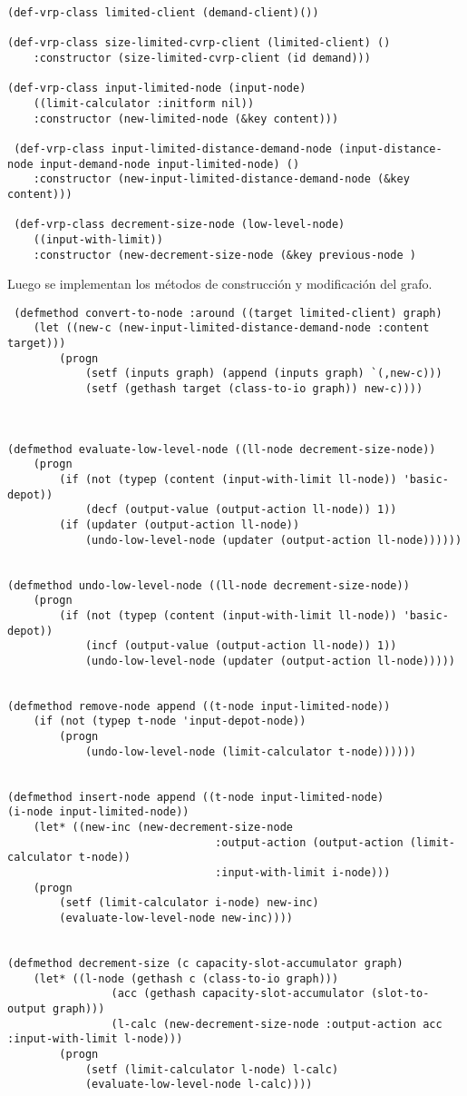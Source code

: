 \begin{lstlisting}
(def-vrp-class limited-client (demand-client)())
    
(def-vrp-class size-limited-cvrp-client (limited-client) ()
	:constructor (size-limited-cvrp-client (id demand)))
	
(def-vrp-class input-limited-node (input-node) 
	((limit-calculator :initform nil))
	:constructor (new-limited-node (&key content)))

 (def-vrp-class input-limited-distance-demand-node (input-distance-node input-demand-node input-limited-node) ()
	:constructor (new-input-limited-distance-demand-node (&key content)))
	
 (def-vrp-class decrement-size-node (low-level-node)
	((input-with-limit))
	:constructor (new-decrement-size-node (&key previous-node )
\end{lstlisting}

Luego se implementan los métodos de construcción y modificación del grafo.

\begin{lstlisting}
 (defmethod convert-to-node :around ((target limited-client) graph)
	(let ((new-c (new-input-limited-distance-demand-node :content target)))
		(progn
			(setf (inputs graph) (append (inputs graph) `(,new-c)))
			(setf (gethash target (class-to-io graph)) new-c))))



(defmethod evaluate-low-level-node ((ll-node decrement-size-node))
	(progn
		(if (not (typep (content (input-with-limit ll-node)) 'basic-depot))
			(decf (output-value (output-action ll-node)) 1))
		(if (updater (output-action ll-node))
			(undo-low-level-node (updater (output-action ll-node))))))


(defmethod undo-low-level-node ((ll-node decrement-size-node))
	(progn
		(if (not (typep (content (input-with-limit ll-node)) 'basic-depot))
			(incf (output-value (output-action ll-node)) 1))
			(undo-low-level-node (updater (output-action ll-node)))))


(defmethod remove-node append ((t-node input-limited-node))
	(if (not (typep t-node 'input-depot-node))
		(progn
			(undo-low-level-node (limit-calculator t-node))))))
			

(defmethod insert-node append ((t-node input-limited-node) 
(i-node input-limited-node))
	(let* ((new-inc (new-decrement-size-node 
								:output-action (output-action (limit-calculator t-node))
								:input-with-limit i-node)))
	(progn
		(setf (limit-calculator i-node) new-inc)
		(evaluate-low-level-node new-inc))))

		
(defmethod decrement-size (c capacity-slot-accumulator graph)
	(let* ((l-node (gethash c (class-to-io graph)))
				(acc (gethash capacity-slot-accumulator (slot-to-output graph)))
				(l-calc (new-decrement-size-node :output-action acc :input-with-limit l-node)))
		(progn
			(setf (limit-calculator l-node) l-calc)
			(evaluate-low-level-node l-calc))))
\end{lstlisting}

